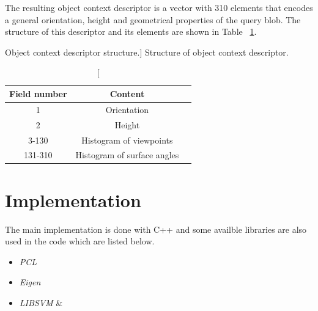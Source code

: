 


The resulting object context descriptor is a vector with 310 elements that encodes a general orientation, height and
geometrical properties of the query blob.
The structure of this descriptor and its elements are shown in Table ~\ref{Descriptor.table}.

\begin{table}
\centering
\caption
[Object context descriptor structure.]
{Structure of object context descriptor.}
\label{Descriptor.table}
\begin{tabular}{|c|c|c|}
\hline
Field number & Content\\

\hline

1 & Orientation\\

\hline

2 & Height\\

\hline

3-130 & Histogram of viewpoints \\

\hline

131-310 &  Histogram of surface angles\\

\hline

\end{tabular}
\end{table}

% 
% 


\section{Implementation}

The main implementation is done with C++ and some availble libraries are also used in the code which are listed below.   

\begin{itemize}
 \item {\it PCL} \cite{Rusu_ICRA2011_PCL}
 \item {\it Eigen} \cite{eigenweb}
 \item {\it LIBSVM} \cite{LIBSVM} \& \cite{li2010holistic}
\end{itemize}

